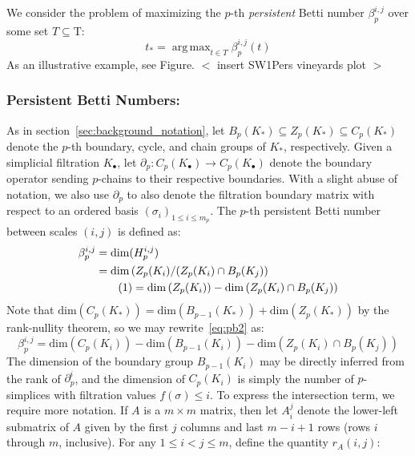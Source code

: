 \documentclass[10pt]{article}
\DeclareMathOperator*{\argmax}{arg\,max}
\newcommand\numberthis{\addtocounter{equation}{1}\tag{\theequation}}
\begin{document}
We consider the problem of maximizing the $p$-th \emph{persistent} Betti number $\beta^{i,j}_p$ over some set $T \subseteq \mathrm{T}$: 
\begin{equation}
	t_\ast = \argmax_{t \in T}	 \beta_{p}^{i,j}(t)
\end{equation}
As an illustrative example, see Figure. 
$<$ insert SW1Pers vineyards plot $>$


\subsubsection*{Persistent Betti Numbers:} 
As in section~\ref{sec:background_notation}, let $B_p(K_\ast) \subseteq Z_p(K_\ast) \subseteq C_p(K_\ast)$ denote the $p$-th boundary, cycle, and chain groups of $K_\ast$, respectively. 
Given a simplicial filtration $K_{\bullet}$, let $\partial_p : C_p( K_{\bullet}) \to C_p(K_{\bullet})$ denote the boundary operator sending $p$-chains to their respective boundaries. 
With a slight abuse of notation, we also use $\partial_p$ to also denote the filtration boundary matrix with respect to an ordered basis $(\sigma_i)_{1 \leq i \leq m_p}$.  
The $p$-th persistent Betti number between scales $(i,j)$ is defined as: 
\begin{align*}
	\beta_p^{i,j} &= \mathrm{dim}(H_p^{i,j}) \\
	&= \mathrm{dim} \left( Z_p(K_i) / (Z_p(K_i) \cap B_p(K_j) \right) \\
	& \numberthis = \mathrm{dim} \left( Z_p(K_i) \right) - \mathrm{dim}\left( Z_p(K_i) \cap B_p(K_j) \right ) \label{eq:pb2}
\end{align*}
Note that $\mathrm{dim}(C_p(K_\ast)) = \mathrm{dim}(B_{p-1}(K_\ast)) + \mathrm{dim}(Z_p(K_\ast))$ by the rank-nullity theorem, so we may rewrite~\eqref{eq:pb2} as:
\begin{equation} \label{eq:pb3}
\beta_p^{i,j} = \mathrm{dim} \left( C_p(K_i) \right) - \mathrm{dim} \left( B_{p-1}(K_i) \right) - \mathrm{dim}\left( Z_p(K_i) \cap B_p(K_j) \right )  
\end{equation}
The dimension of the boundary group $B_{p-1}(K_i)$ may be directly inferred from the rank of $\partial_p^{i}$, and the dimension of $C_p(K_i)$ is simply the number of $p$-simplices with filtration values $f(\sigma) \leq i$. To express the intersection term, we require more notation. If $A$ is a $m \times m$ matrix, then let $A_i^j$ denote the lower-left submatrix of $A$ given by the first $j$ columns and last $m - i + 1$ rows (rows $i$ through $m$, inclusive). For any $1 \leq i < j \leq m$, define the quantity $r_A(i,j)$:
\end{document}
